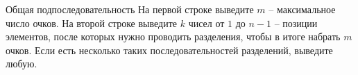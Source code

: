 \begin{problem}{Общая подпоследовательность}
На первой строке выведите $m$ -- максимальное число очков.
На второй строке выведите $k$ чисел от $1$ до $n-1$ -- позиции элементов, после которых нужно
проводить разделения, чтобы в итоге набрать $m$ очков.
Если есть несколько таких последовательностей разделений, выведите любую.


\Examples

\begin{example}
%
\end{example}

\end{problem}
